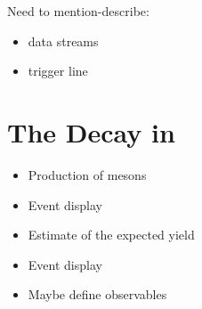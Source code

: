 Need to mention-describe:
\begin{itemize}
  \item data streams
  \item trigger line
\end{itemize}

\section{The \BJpsiKst Decay in \lhcb}
\label{BspsiKst_at_lhcb}
\begin{itemize}
  \item Production of \Bs mesons
  \item Event display
  \item Estimate of the expected yield
  \item Event display
  \item Maybe define observables
\end{itemize}
